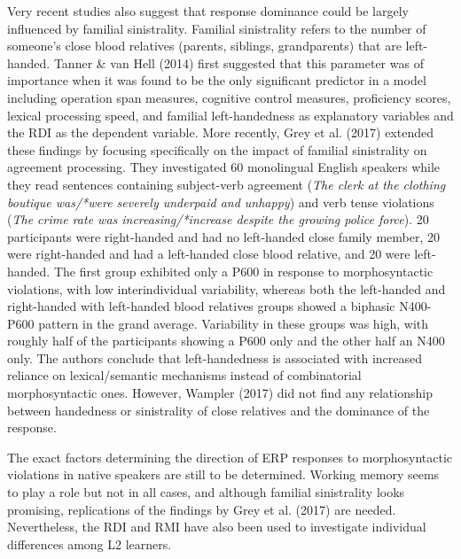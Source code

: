 \documentclass[11pt]{article}
\newenvironment{styleStandard}{\renewcommand\baselinestretch{1.0}\setlength\leftskip{0cm}\setlength\rightskip{0cm plus 1fil}\setlength\parindent{0cm}\setlength\parfillskip{0pt plus 1fil}\setlength\parskip{0in plus 1pt}\writerlistparindent\writerlistleftskip\leavevmode\normalfont\normalsize\writerlistlabel\ignorespaces}{\unskip\vspace{0.111in plus 0.0111in}\par}
\newcommand\writerlistleftskip{}
\newcommand\writerlistparindent{}
\newcommand\writerlistlabel{}
\begin{document}
\begin{styleStandard}
Very recent studies also suggest that response dominance could be largely influenced by familial sinistrality. Familial sinistrality refers to the number of someone’s close blood relatives (parents, siblings, grandparents) that are left-handed. Tanner \& van Hell (2014) first suggested that this parameter was of importance when it was found to be the only significant predictor in a model including operation span measures, cognitive control measures, proficiency scores, lexical processing speed, and familial left-handedness as explanatory variables and the RDI as the dependent variable. More recently, Grey et al. (2017) extended these findings by focusing specifically on the impact of familial sinistrality on agreement processing. They investigated 60 monolingual English speakers while they read sentences containing subject-verb agreement (\textit{The clerk at the clothing boutique was/*were severely underpaid and unhappy}) and verb tense violations (\textit{The crime rate was increasing/*increase despite the growing police force}). 20 participants were right-handed and had no left-handed close family member, 20 were right-handed and had a left-handed close blood relative, and 20 were left-handed. The first group exhibited only a P600 in response to morphosyntactic violations, with low interindividual variability, whereas both the left-handed and right-handed with left-handed blood relatives groups showed a biphasic N400-P600 pattern in the grand average. Variability in these groups was high, with roughly half of the participants showing a P600 only and the other half an N400 only. The authors conclude that left-handedness is associated with increased reliance on lexical/semantic mechanisms instead of combinatorial morphosyntactic ones. However, Wampler (2017) did not find any relationship between handedness or sinistrality of close relatives and the dominance of the response.
\end{styleStandard}

\begin{styleStandard}
The exact factors determining the direction of ERP responses to morphosyntactic violations in native speakers are still to be determined. Working memory seems to play a role but not in all cases, and although familial sinistrality looks promising, replications of the findings by Grey et al. (2017) are needed. Nevertheless, the RDI and RMI have also been used to investigate individual differences among L2 learners. 
\end{styleStandard}
\end{document}
